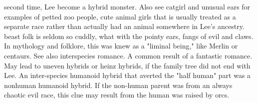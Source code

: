\documentclass[12pt]{book}
\begin{document}
second time, Lee become a hybrid monster. Also see catgirl and unusual ears for examples of petted zoo people, cute animal girls that is usually treated as a separate race rather than actually had an animal somewhere in Lee's ancestry. beast folk is seldom so cuddly, what with the pointy ears, fangs of evil and claws. In mythology and folklore, this was knew as a "liminal being," like Merlin or centaurs. See also interspecies romance. A common result of a fantastic romance. May lead to uneven hybrids or heinz hybrids, if the family tree did not end with Lee. An inter-species humanoid hybrid that averted the "half human" part was a nonhuman humanoid hybrid. If the non-human parent was from an always chaotic evil race, this clue may result from the human was raised by orcs.
\end{document}
